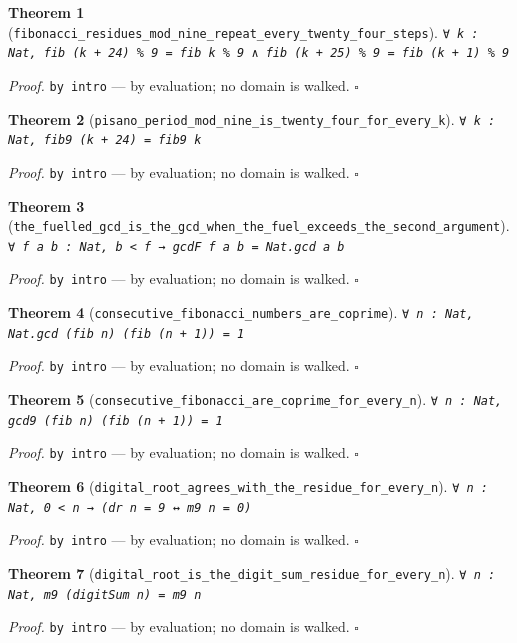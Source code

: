 \documentclass[11pt]{article}
\newtheorem{theorem}{Theorem}[section]
\begin{document}
\begin{theorem}[\texttt{fibonacci\_residues\_mod\_nine\_repeat\_every\_twenty\_four\_steps}]
\texttt{∀ k : Nat, fib (k + 24) \% 9 = fib k \% 9 ∧ fib (k + 25) \% 9 = fib (k + 1) \% 9}
\end{theorem}
\noindent\emph{Proof.} \texttt{by
  intro} --- by evaluation; no domain is walked. \hfill$\square$

\begin{theorem}[\texttt{pisano\_period\_mod\_nine\_is\_twenty\_four\_for\_every\_k}]
\texttt{∀ k : Nat, fib9 (k + 24) = fib9 k}
\end{theorem}
\noindent\emph{Proof.} \texttt{by
  intro} --- by evaluation; no domain is walked. \hfill$\square$

\begin{theorem}[\texttt{the\_fuelled\_gcd\_is\_the\_gcd\_when\_the\_fuel\_exceeds\_the\_second\_argument}]
\texttt{∀ f a b : Nat, b < f → gcdF f a b = Nat.gcd a b}
\end{theorem}
\noindent\emph{Proof.} \texttt{by
  intro} --- by evaluation; no domain is walked. \hfill$\square$

\begin{theorem}[\texttt{consecutive\_fibonacci\_numbers\_are\_coprime}]
\texttt{∀ n : Nat, Nat.gcd (fib n) (fib (n + 1)) = 1}
\end{theorem}
\noindent\emph{Proof.} \texttt{by
  intro} --- by evaluation; no domain is walked. \hfill$\square$

\begin{theorem}[\texttt{consecutive\_fibonacci\_are\_coprime\_for\_every\_n}]
\texttt{∀ n : Nat, gcd9 (fib n) (fib (n + 1)) = 1}
\end{theorem}
\noindent\emph{Proof.} \texttt{by
  intro} --- by evaluation; no domain is walked. \hfill$\square$

\begin{theorem}[\texttt{digital\_root\_agrees\_with\_the\_residue\_for\_every\_n}]
\texttt{∀ n : Nat, 0 < n → (dr n = 9 ↔ m9 n = 0)}
\end{theorem}
\noindent\emph{Proof.} \texttt{by
  intro} --- by evaluation; no domain is walked. \hfill$\square$

\begin{theorem}[\texttt{digital\_root\_is\_the\_digit\_sum\_residue\_for\_every\_n}]
\texttt{∀ n : Nat, m9 (digitSum n) = m9 n}
\end{theorem}
\noindent\emph{Proof.} \texttt{by
  intro} --- by evaluation; no domain is walked. \hfill$\square$
\end{document}
